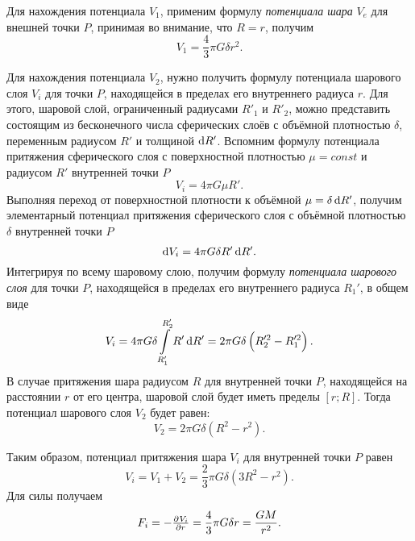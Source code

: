 \documentclass[11pt, a4paper]{article}
\theoremstyle{plain}
\theoremstyle{definition}
\theoremstyle{remark}
\begin{document}
Для нахождения потенциала $V_1$, применим формулу \textit{потенциала шара} $V_e$ для внешней точки $P$, принимая во внимание, что $R=r$, получим
\begin{equation*}
    V_1 = \dfrac{4}{3}\pi G\delta r^2.
\end{equation*}

Для нахождения потенциала $V_2$, нужно получить формулу потенциала шарового слоя $V_i$ для точки $P$, находящейся в пределах его внутреннего радиуса $r$. Для этого, шаровой слой, ограниченный радиусами $R'_1$ и $R'_2$, можно представить состоящим из бесконечного числа сферических слоёв с объёмной плотностью $\delta$, переменным радиусом $R'$ и толщиной $\dif R'$.
Вспомним формулу потенциала притяжения сферического слоя с поверхностной плотностью $\mu=const$ и радиусом $R'$ внутренней точки $P$
\begin{equation*}
    V_i = 4\pi G\mu R'.
\end{equation*}
Выполняя переход от поверхностной плотности к объёмной $\mu = \delta \dif R'$, получим элементарный потенциал притяжения сферического слоя с объёмной плотностью $\delta$ внутренней точки $P$
\begin{equation*}
    \dif V_i = 4\pi G\delta R'\dif R'.
\end{equation*}
Интегрируя по всему шаровому слою, получим формулу \textit{потенциала шарового слоя} для точки $P$, находящейся в пределах его внутреннего радиуса $R_1'$, в общем виде
\begin{equation*}
    V_i = 4\pi G\delta \int\limits_{R_1'}^{R_2'} R'\dif R' = 2\pi G\delta \left( R_2'^2 - R_1'^2 \right).
\end{equation*}
В случае притяжения шара радиусом $R$ для внутренней точки $P$, находящейся на расстоянии $r$ от его центра, шаровой слой будет иметь пределы $[r; R]$. Тогда потенциал шарового слоя $V_2$ будет равен:
\begin{equation*}
    V_2 = 2\pi G\delta \left( R^2 - r^2 \right).
\end{equation*}

Таким образом, потенциал притяжения шара $V_i$ для внутренней точки $P$ равен
\begin{equation*}
    V_i = V_1 + V_2 = \dfrac{2}{3}\pi G\delta \left( 3R^2 - r^2 \right).
\end{equation*}
Для силы получаем
\begin{equation*}
    F_i = -\pd{V_i}{r} = \dfrac{4}{3}\pi G\delta r = \dfrac{GM}{r^2}.
\end{equation*}
\end{document}
